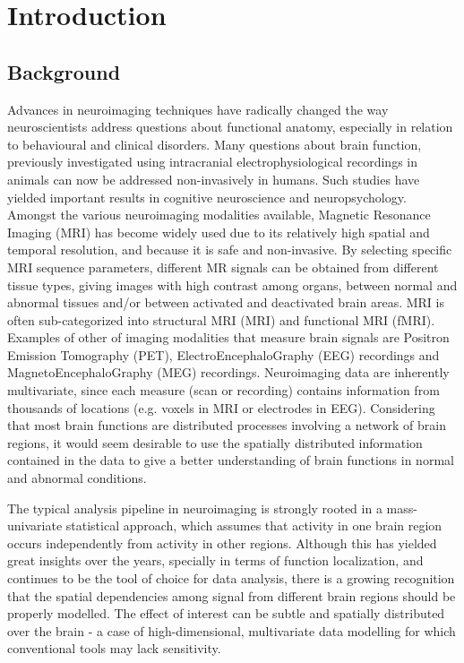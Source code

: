
\chapter{Introduction}
\label{chap:intro}
\minitoc

\section{Background}

Advances in neuroimaging techniques have radically changed the way neuroscientists address questions about functional anatomy, especially in relation to behavioural and clinical disorders. Many questions about brain function, previously investigated using intracranial electrophysiological recordings in animals can now be addressed non-invasively in humans. Such studies have yielded important results in cognitive neuroscience and neuropsychology. Amongst the various neuroimaging modalities available, Magnetic Resonance Imaging (MRI) has become widely used due to its relatively high spatial and temporal resolution, and because it is safe and non-invasive. By selecting specific MRI sequence parameters, different MR signals can be obtained from different tissue types, giving images with high contrast among organs, between normal and abnormal tissues and/or between activated and deactivated brain areas. MRI is often sub-categorized into structural MRI (MRI) and functional MRI (fMRI). Examples of other of imaging modalities that measure  brain signals are Positron Emission Tomography (PET), ElectroEncephaloGraphy (EEG) recordings and MagnetoEncephaloGraphy (MEG) recordings. Neuroimaging data are inherently multivariate, since each measure (scan or recording) contains information from thousands of locations (e.g. voxels in MRI or electrodes in EEG). Considering that most brain functions are distributed processes involving a network of brain regions, it would seem desirable to use the spatially distributed information contained in the data to give a better understanding of brain functions in normal and abnormal conditions. 

The typical analysis pipeline in neuroimaging is strongly rooted in a mass-univariate statistical approach, which assumes that activity in one brain region occurs independently from activity in other regions. Although this has yielded great insights over the years, specially in terms of function localization, and continues to be the tool of choice for data analysis, there is a growing recognition that the spatial dependencies among signal from different brain regions should be properly modelled. The effect of interest can be subtle and spatially distributed over the brain - a case of high-dimensional, multivariate data modelling for which conventional tools may lack sensitivity. 

